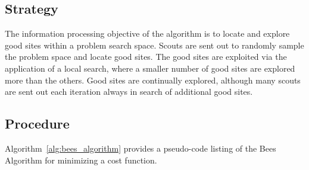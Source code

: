 \subsection{Strategy}
The information processing objective of the algorithm is to locate and explore good sites within a problem search space.
Scouts are sent out to randomly sample the problem space and locate good sites. The good sites are exploited via the application of a local search, where a smaller number of good sites are explored more than the others. Good sites are continually explored, although many scouts are sent out each iteration always in search of additional good sites.

\subsection{Procedure}
Algorithm~\ref{alg:bees_algorithm} provides a pseudo-code listing of the Bees Algorithm for minimizing a cost function. 

